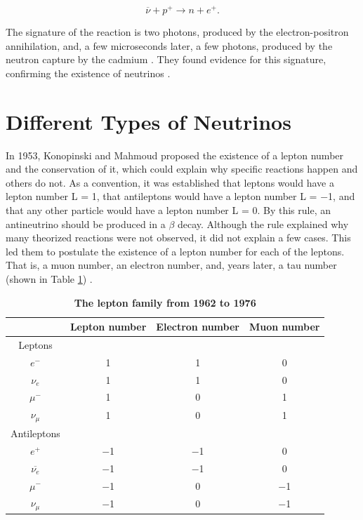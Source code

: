 \begin{equation}
	\overline{\nu} + p^+ \longrightarrow n + e^+.
	\label{inverse_beta_decay_eq}
\end{equation}

The signature of the reaction is two photons, produced by the electron-positron annihilation, and, a few microseconds later, a few photons, produced by the neutron capture by the cadmium \cite{nobel_leptons}. They found evidence for this signature, confirming the existence of neutrinos \cite{cowan_reines}. 

\section{Different Types of Neutrinos}
In 1953, Konopinski and Mahmoud proposed the existence of a lepton number and the conservation of it, which could explain why specific reactions happen and others do not. As a convention, it was established that leptons would have a lepton number L = 1, that antileptons would have a lepton number L = $-$1, and that any other particle would have a lepton number L = 0. By this rule, an antineutrino should be produced in a $\beta$ decay. Although the rule explained why many theorized reactions were not observed, it did not explain a few cases. This led them to postulate the existence of a lepton number for each of the leptons. That is, a muon number, an electron number, and, years later, a tau number (shown in Table \ref{lepton_family}) \cite{Konopinski_Mahmoud}. 

\begin{table}
	\begin{center}
		\begin{tabular}{cccc}
			\bottomrule
						& \textbf{Lepton number}	&	\textbf{Electron number}	&	\textbf{Muon number}\\
			\toprule
			Leptons			&		&		&	 \\
			$e^-$			&	1	&	1	&	0\\ 
			$\nu_e$			&	1	&	1	&	0\\
			$\mu^-$			&	1	&	0	&	1\\	
			$\nu_\mu$		&	1	&	0	&	1\\
			Antileptons		&		&		&	  \\
			$e^+$			&	$-$1	&	$-$1	&	0\\	
			$\overline{\nu_e}$	&	$-$1	&	$-$1	&	0\\
			$\mu^-$			&	$-$1	&	0	&	$-$1\\
			$\nu_\mu$		&	$-$1	&	0	&	$-$1\\
			\toprule
		\end{tabular}
		\caption[The lepton family]{{\textbf{The lepton family from 1962 to 1976}} \cite{griffiths}}
		\label{lepton_family}
	\end{center}
\end{table}

